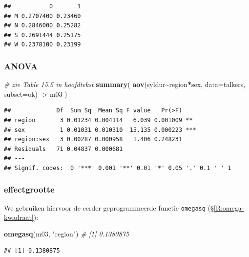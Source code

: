 \documentclass[
]{book}
\newenvironment{Shaded}{\begin{snugshade}}{\end{snugshade}}
\newcommand{\CommentTok}[1]{\textcolor[rgb]{0.56,0.35,0.01}{\textit{#1}}}
\newcommand{\DataTypeTok}[1]{\textcolor[rgb]{0.13,0.29,0.53}{#1}}
\newcommand{\KeywordTok}[1]{\textcolor[rgb]{0.13,0.29,0.53}{\textbf{#1}}}
\newcommand{\NormalTok}[1]{#1}
\newcommand{\OperatorTok}[1]{\textcolor[rgb]{0.81,0.36,0.00}{\textbf{#1}}}
\newcommand{\StringTok}[1]{\textcolor[rgb]{0.31,0.60,0.02}{#1}}
\begin{document}
\begin{verbatim}
##           0       1
## M 0.2707400 0.23460
## N 0.2846000 0.25282
## S 0.2691444 0.25175
## W 0.2378100 0.23199
\end{verbatim}

\hypertarget{anova-2}{%
\subsubsection{ANOVA}\label{anova-2}}

\begin{Shaded}
\begin{Highlighting}[]
\CommentTok{\# zie Table 15.5 in hoofdtekst}
\KeywordTok{summary}\NormalTok{( }\KeywordTok{aov}\NormalTok{(syldur}\OperatorTok{\textasciitilde{}}\NormalTok{region}\OperatorTok{*}\NormalTok{sex, }\DataTypeTok{data=}\NormalTok{talkers, }\DataTypeTok{subset=}\NormalTok{ok) {-}\textgreater{}}\StringTok{ }\NormalTok{m03 )}
\end{Highlighting}
\end{Shaded}

\begin{verbatim}
##             Df  Sum Sq  Mean Sq F value   Pr(>F)    
## region       3 0.01234 0.004114   6.039 0.001009 ** 
## sex          1 0.01031 0.010310  15.135 0.000223 ***
## region:sex   3 0.00287 0.000958   1.406 0.248231    
## Residuals   71 0.04837 0.000681                     
## ---
## Signif. codes:  0 '***' 0.001 '**' 0.01 '*' 0.05 '.' 0.1 ' ' 1
\end{verbatim}

\hypertarget{effectgrootte}{%
\subsubsection{effectgrootte}\label{effectgrootte}}

We gebruiken hiervoor de eerder geprogrammeerde functie \texttt{omegasq} (§\ref{R:omega-kwadraat}):

\begin{Shaded}
\begin{Highlighting}[]
\KeywordTok{omegasq}\NormalTok{(m03, }\StringTok{"region"}\NormalTok{)      }\CommentTok{\# [1] 0.1380875}
\end{Highlighting}
\end{Shaded}

\begin{verbatim}
## [1] 0.1380875
\end{verbatim}
\end{document}

